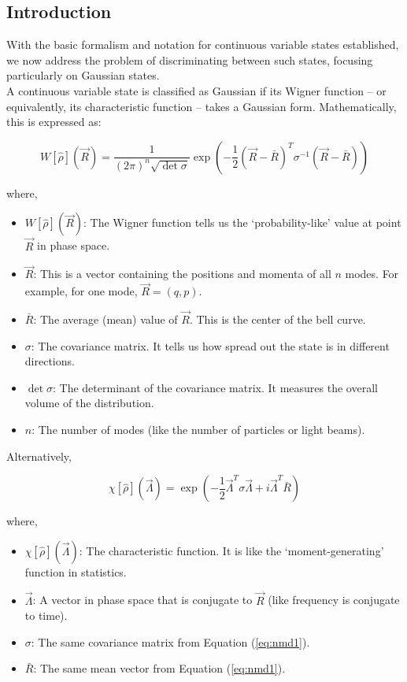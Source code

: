 \subsection{Introduction}
With the basic formalism and notation for continuous variable states established, we now address the problem of discriminating between such states, focusing particularly on Gaussian states.\\

A continuous variable state is classified as Gaussian if its Wigner function -- or equivalently, its characteristic function -- takes a Gaussian form. Mathematically, this is expressed as:

\begin{equation}
    W[\hat{\rho}](\vec{R}) = \frac{1}{(2\pi)^n \sqrt{\det \sigma}} \exp\left(-\frac{1}{2} (\vec{R} - \bar{R})^T \sigma^{-1} (\vec{R} - \bar{R})\right)
    \label{eq:nmd1}
\end{equation}

where,
\begin{itemize}
    \item $W[\hat{\rho}](\vec{R})$: The Wigner function tells us the `probability-like' value at point $\vec{R}$ in phase space.
    \item $\vec{R}$: This is a vector containing the positions and momenta of all $n$ modes. For example, for one mode, $\vec{R} = (q, p)$.
    \item $\bar{R}$: The average (mean) value of $\vec{R}$. This is the center of the bell curve.
    \item $\sigma$: The covariance matrix. It tells us how spread out the state is in different directions.
    \item $\det \sigma$: The determinant of the covariance matrix. It measures the overall volume of the distribution.
    \item $n$: The number of modes (like the number of particles or light beams).
\end{itemize}

Alternatively,

\begin{equation}
    \chi[\hat{\rho}](\vec{\Lambda}) = \exp\left(-\frac{1}{2} \vec{\Lambda}^T \sigma \vec{\Lambda} + i \vec{\Lambda}^T \bar{R}\right)
\end{equation}

where,
\begin{itemize}
    \item $\chi[\hat{\rho}](\vec{\Lambda})$: The characteristic function. It is like the `moment-generating' function in statistics.
    \item $\vec{\Lambda}$: A vector in phase space that is conjugate to $\vec{R}$ (like frequency is conjugate to time).
    \item $\sigma$: The same covariance matrix from Equation (\ref{eq:nmd1}).
    \item $\bar{R}$: The same mean vector from Equation (\ref{eq:nmd1}).
\end{itemize}

